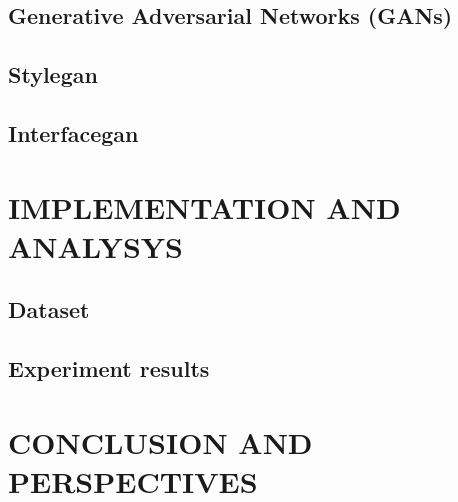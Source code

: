 \documentclass[12pt]{article}
\begin{document}
    \subsection{\Large Generative Adversarial Networks (GANs)}
    \subsection{\Large Stylegan}
    \subsection{\Large Interfacegan}
    \section{\Large IMPLEMENTATION AND ANALYSYS}
    \subsection{\Large Dataset}
    \subsection{\Large Experiment results}
    \section{\Large CONCLUSION AND PERSPECTIVES}
    
    
	
\end{document}
